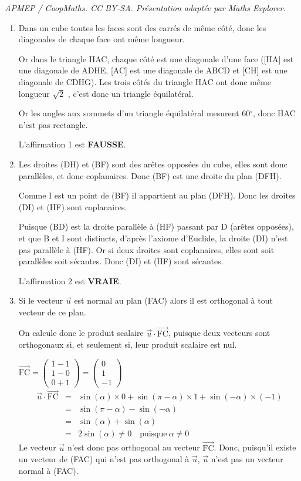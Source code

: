\documentclass[10pt]{article}
\providecommand{\vect}[1]{\overrightarrow{#1}}
\providecommand{\vectt}[1]{\overrightarrow{\mathrm{#1}}}
\begin{document}
\noindent\textit{APMEP / CoopMaths. CC BY-SA. Présentation adaptée par Maths Explorer.}\par\medskip
\smallskip

\begin{enumerate}
	\item Dans un cube toutes les faces sont des carrés de même côté, donc les diagonales de chaque face ont même longueur.

Or dans le triangle HAC, chaque côté est une diagonale d'une face ([HA] est une diagonale de ADHE, [AC] est une diagonale de ABCD et [CH] est une diagonale de CDHG). Les trois côtés du triangle HAC ont donc même longueur $\sqrt2$
, c'est donc un triangle équilatéral.

Or les angles aux sommets d'un triangle équilatéral mesurent 60\ensuremath{^\circ}, donc HAC n'est pas rectangle.

\smallskip

L'affirmation 1 est \textbf{FAUSSE}.
	\item Les droites (DH) et (BF) sont des arêtes opposées du cube, elles sont donc parallèles, et donc coplanaires. Donc (BF) est une droite du plan (DFH).

Comme I est un point de (BF) il appartient au plan (DFH). Donc les droites (DI) et (HF) sont coplanaires.

Puisque (BD) est la droite parallèle à (HF) passant par D (arêtes opposées), et que B et I sont distincts, d'après l'axiome d'Euclide, la droite (DI) n'est pas parallèle à (HF). Or si deux droites sont coplanaires, elles sont soit parallèles soit sécantes. Donc (DI) et (HF) sont sécantes.

\smallskip
	
L'affirmation 2 est \textbf{VRAIE}.
	\item Si le vecteur $\vect{u}$ est normal au plan (FAC) alors il est orthogonal à tout vecteur de ce plan.

On calcule donc le produit scalaire $\vect{u} \cdot \vect{\text{FC}}$, puisque deux vecteurs sont orthogonaux si, et seulement si, leur produit scalaire est nul.
	
	$\vectt{FC} = \begin{pmatrix}1-1\\1-0\\0+1\end{pmatrix} = \begin{pmatrix}0\\1\\-1\end{pmatrix}$
\begin{eqnarray*}
\vect{u} \cdot \vectt{FC} &=& \sin(\alpha) \times 0 + \sin(\pi - \alpha) \times 1 + \sin(-\alpha) \times (-1)\\
		&=& \sin(\pi - \alpha) - \sin(-\alpha)\\
		&=& \sin(\alpha) + \sin(\alpha)\\
		&=& \boxed{2\sin(\alpha) \neq 0} \quad \text{puisque} \:\alpha \ne 0
	\end{eqnarray*}
	Le vecteur $\vect{u}$ n'est donc pas orthogonal au vecteur $\vect{\text{FC}}$. Donc, puisqu'il existe un vecteur de (FAC) qui n'est pas orthogonal à $\vect{u}$, $\vect{u}$ n'est pas un vecteur normal à (FAC).


\end{enumerate}
\end{document}
